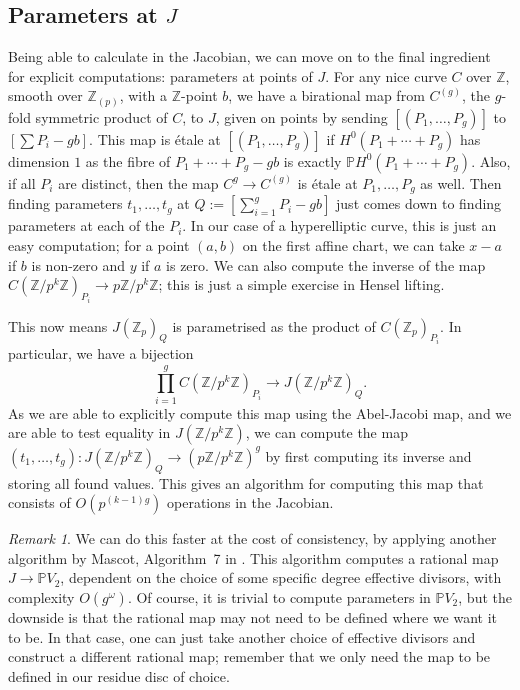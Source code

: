 \documentclass[12pt]{article}
\newcommand{\Z}{\mathbb{Z}}
\renewcommand{\P}{\mathbb{P}}
\theoremstyle{plain}
\theoremstyle{definition}
\theoremstyle{remark}
\newtheorem{rem}[thm]{Remark} %
\begin{document}
\subsection{Parameters at \texorpdfstring{$J$}{J}}
\label{subs:paramj}
Being able to calculate in the Jacobian, we can move on to the final ingredient for explicit computations: parameters at points of $J$. For any nice curve $C$ over $\Z$, smooth over $\Z_{(p)}$, with a $\Z$-point $b$, we have a birational map from $C^{(g)}$, the $g$-fold symmetric product of $C$, to $J$, given on points by sending $[(P_1,\dots,P_g)]$ to $[\sum P_i - gb]$. This map is \'etale at $[(P_1,\dots,P_g)]$ if $H^0(P_1 + \cdots + P_g)$ has dimension $1$ as the fibre of $P_1 + \cdots + P_g -gb$ is exactly $\P H^0(P_1 + \cdots + P_g)$. Also, if all $P_i$ are distinct, then the map $C^g \to C^{(g)}$ is \'etale at $P_1,\dots,P_g$ as well. Then finding parameters $t_1,\dots,t_g$ at $Q := [\sum_{i=1}^g P_i - gb]$ just comes down to finding parameters at each of the $P_i$. In our case of a hyperelliptic curve, this is just an easy computation; for a point $(a,b)$ on the first affine chart, we can take $x-a$ if $b$ is non-zero and $y$ if $a$ is zero. We can also compute the inverse of the map $C(\Z/p^k\Z)_{P_i} \to p\Z/p^k\Z$; this is just a simple exercise in Hensel lifting.

This now means $J(\Z_p)_Q$ is parametrised as the product of $C(\Z_p)_{P_i}$. In particular, we have a bijection
\[
\prod_{i=1}^g C(\Z/p^k\Z)_{P_i} \to J(\Z/p^k\Z)_{Q}.
\] As we are able to explicitly compute this map using the Abel-Jacobi map, and we are able to test equality in $J(\Z/p^k\Z)$, we can compute the map $(t_1,\dots,t_g): J(\Z/p^k\Z)_Q \to (p\Z/p^{k}\Z)^g$ by first computing its inverse and storing all found values. This gives an algorithm for computing this map that consists of $O(p^{(k-1)g})$ operations in the Jacobian.

\begin{rem}
\label{rem:faster}
We can do this faster at the cost of consistency, by applying another algorithm by Mascot, Algorithm~7 in \cite{mascot18}. This algorithm computes a rational map $J \to \P V_2$, dependent on the choice of some specific degree effective divisors, with complexity $O(g^\omega)$. Of course, it is trivial to compute parameters in $\P V_2$, but the downside is that the rational map may not need to be defined where we want it to be. In that case, one can just take another choice of effective divisors and construct a different rational map; remember that we only need the map to be defined in our residue disc of choice.
\end{rem}
\end{document}
